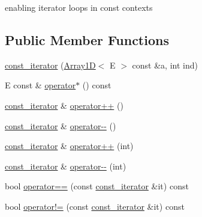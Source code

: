 enabling iterator loops in const contexts \subsection*{Public Member Functions}
\begin{DoxyCompactItemize}
\item 
\mbox{\hyperlink{classbridges_1_1datastructure_1_1_array1_d_1_1const__iterator_a1ea421b46a3f0907190a91752e1f5b32}{const\+\_\+iterator}} (\mbox{\hyperlink{classbridges_1_1datastructure_1_1_array1_d}{Array1D}}$<$ E $>$ const \&a, int ind)
\item 
E const  \& \mbox{\hyperlink{classbridges_1_1datastructure_1_1_array1_d_1_1const__iterator_aec062ef1375b53092b872838c415081f}{operator$\ast$}} () const
\item 
\mbox{\hyperlink{classbridges_1_1datastructure_1_1_array1_d_1_1const__iterator}{const\+\_\+iterator}} \& \mbox{\hyperlink{classbridges_1_1datastructure_1_1_array1_d_1_1const__iterator_a754c1601b52473d4c8abc5e20af62b81}{operator++}} ()
\item 
\mbox{\hyperlink{classbridges_1_1datastructure_1_1_array1_d_1_1const__iterator}{const\+\_\+iterator}} \& \mbox{\hyperlink{classbridges_1_1datastructure_1_1_array1_d_1_1const__iterator_a700c9de64036c2cb61836e1ddc23cc1c}{operator-\/-\/}} ()
\item 
\mbox{\hyperlink{classbridges_1_1datastructure_1_1_array1_d_1_1const__iterator}{const\+\_\+iterator}} \& \mbox{\hyperlink{classbridges_1_1datastructure_1_1_array1_d_1_1const__iterator_aa7eb1bbe97e8f3257dc7d850be8f5937}{operator++}} (int)
\item 
\mbox{\hyperlink{classbridges_1_1datastructure_1_1_array1_d_1_1const__iterator}{const\+\_\+iterator}} \& \mbox{\hyperlink{classbridges_1_1datastructure_1_1_array1_d_1_1const__iterator_a815972df8b28780f88dac8133322e8ab}{operator-\/-\/}} (int)
\item 
bool \mbox{\hyperlink{classbridges_1_1datastructure_1_1_array1_d_1_1const__iterator_a004eca869afdc913a1d1a448bb4b7871}{operator==}} (const \mbox{\hyperlink{classbridges_1_1datastructure_1_1_array1_d_1_1const__iterator}{const\+\_\+iterator}} \&it) const
\item 
bool \mbox{\hyperlink{classbridges_1_1datastructure_1_1_array1_d_1_1const__iterator_ada463ec150271769b2a9e34c9bebdd05}{operator!=}} (const \mbox{\hyperlink{classbridges_1_1datastructure_1_1_array1_d_1_1const__iterator}{const\+\_\+iterator}} \&it) const
\end{DoxyCompactItemize}


